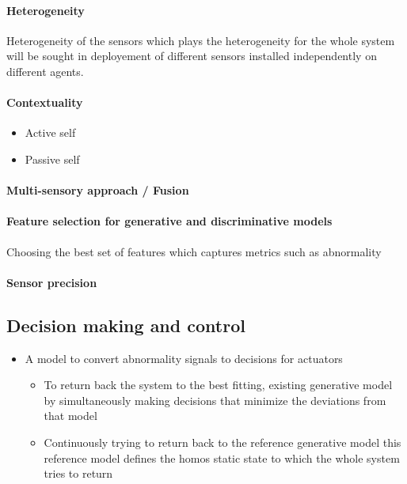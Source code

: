 \documentclass{article}
\begin{document}
			\paragraph{Heterogeneity}
				Heterogeneity of the sensors which plays the heterogeneity for the whole system  will be sought in deployement of different sensors installed independently on different agents.  
				
			\paragraph{Contextuality}
				\begin{itemize}
					\item Active self
					\item Passive self
				\end{itemize}
			
			\paragraph{Multi-sensory approach / Fusion}
			
			\paragraph{Feature selection for generative and discriminative models}
			Choosing the best set of features which captures metrics such as abnormality
			
			\paragraph{Sensor precision} 
			
		\subsection{Decision making and control}
			\begin{itemize}
				\item A model to convert abnormality signals to decisions for actuators
				\begin{itemize}
					\item To return back the system to the best fitting, existing generative model by simultaneously making decisions that minimize the deviations from that model
					\item Continuously trying to return back to the reference generative model this reference model defines the homos static state to which the whole system tries to return 
				\end{itemize}
			\end{itemize}
\end{document}
